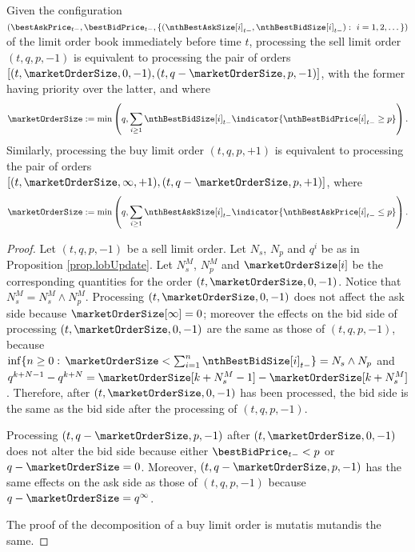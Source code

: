 \begin{prop}
\label{prop.decompositionOfLimitOrder}
 Given the configuration
 $(\bestAskPrice_{t-}, \bestBidPrice_{t-},\lbrace (\nthBestAskSize[i]_{t-}, \nthBestBidSize[i]_{t-}) : \, \, i=1,2,\dots\rbrace )$
 of the limit order book immediately before time $t$,
 processing the sell limit order $(t,q,p,-1)$ is equivalent to processing the pair of orders
 $[(t,\marketOrderSize,0,-1),(t,q-\marketOrderSize,p,-1) ]$,
 with the former having priority over the latter, and where
 \begin{equation*}
  \marketOrderSize:= \min\left(q, \sum_{i\geq 1} \nthBestBidSize[i]_{t-} \indicator{\nthBestBidPrice[i]_{t-}\geq p}\right).
 \end{equation*}
Similarly, processing the buy limit order $(t,q,p,+1)$ is equivalent to processing the pair of orders
$[(t,\marketOrderSize,\infty,+1),(t,q-\marketOrderSize,p,+1) ]$, where
 \begin{equation*}
  \marketOrderSize:= \min\left (q, \sum_{i\geq 1} \nthBestAskSize[i]_{t-} \indicator{\nthBestAskPrice[i]_{t-}\leq  p}\right).
 \end{equation*}
\end{prop}
\begin{proof}
 Let $(t,q,p,-1)$ be a sell limit order.
 Let $N_s$, $N_p$ and $q^i$ be as in Proposition \ref{prop.lobUpdate}.
 Let $N_s^M$, $N_p^M$ and $\marketOrderSize[i]$ be the corresponding quantities
 for the order $(t,\marketOrderSize,0,-1)$.
 Notice that $N_s^M = N_s^M \wedge N_p^M$.
 Processing $(t,\marketOrderSize,0,-1)$ does not affect the ask side
 because $\marketOrderSize[\infty] = 0$;
 moreover the effects on the bid side of processing $(t,\marketOrderSize,0,-1)$
 are the same as those of $(t,q,p,-1)$,
 because $\inf \lbrace n\geq 0 : \, \marketOrderSize < \sum_{i=1}^{n} \nthBestBidSize[i]_{t-} \rbrace = N_s \wedge N_p$
 and $q^{k+N-1} - q^{k+N} = \marketOrderSize[k+N_s^M - 1] - \marketOrderSize[k+N_s^M]$.
 Therefore, after $(t,\marketOrderSize,0,-1)$ has been processed,
 the bid side is the same as the bid side after the processing of $(t,q,p,-1)$.

 Processing $(t,q-\marketOrderSize,p,-1)$ after $(t,\marketOrderSize,0,-1)$
 does not alter the bid side because either $\bestBidPrice_{t-} < p$ or $q-\marketOrderSize=0$.
 Moreover, $(t,q-\marketOrderSize,p,-1)$ has the same effects on the ask side
 as those of $(t,q,p,-1)$ because $q-\marketOrderSize = q^{\infty}$.

 The proof of the decomposition of a buy limit order is mutatis mutandis the same.
\end{proof}


